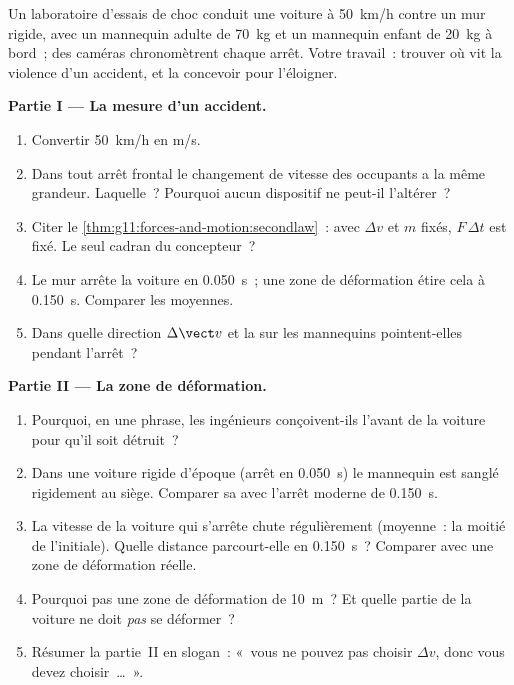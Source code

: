 \begin{problem}
\label{pb:g11:forces-and-motion:1}
Un laboratoire d'essais de choc conduit une voiture à \qty{50}{km/h}
contre un mur rigide, avec un mannequin adulte de \qty{70}{kg} et un
mannequin enfant de \qty{20}{kg} à bord~; des caméras chronomètrent
chaque arrêt. Votre travail~: trouver où vit la violence d'un accident,
et la concevoir pour l'éloigner.

\medskip
\noindent\textbf{Partie I --- La mesure d'un accident.}
\begin{enumerate}
  \item Convertir \qty{50}{km/h} en \unit{m/s}.
  \item Dans tout arrêt frontal le changement de vitesse des occupants
        a la même grandeur. Laquelle~? Pourquoi aucun dispositif ne
        peut-il l'altérer~?
  \item Citer le \cref{thm:g11:forces-and-motion:secondlaw}~: avec
        $\Delta v$ et $m$ fixés, $F\,\Delta t$ est fixé. Le seul cadran
        du concepteur~?
  \item Le mur arrête la voiture en \qty{0.050}{s}~; une zone de
        déformation étire cela à \qty{0.150}{s}. Comparer les
         moyennes.
  \item Dans quelle direction $\Delta \vect v$ et la
         sur les
        mannequins pointent-elles pendant l'arrêt~?
\end{enumerate}

\medskip
\noindent\textbf{Partie II --- La zone de déformation.}
\begin{enumerate}[resume]
  \item Pourquoi, en une phrase, les ingénieurs conçoivent-ils l'avant
        de la voiture pour qu'il soit détruit~?
  \item Dans une voiture rigide d'époque (arrêt en \qty{0.050}{s}) le
        mannequin est sanglé rigidement au siège. Comparer sa
         avec l'arrêt moderne de
        \qty{0.150}{s}.
  \item La vitesse de la voiture qui s'arrête chute régulièrement
        (moyenne~: la moitié de l'initiale). Quelle distance parcourt-elle
        en \qty{0.150}{s}~? Comparer avec une zone de déformation réelle.
  \item Pourquoi pas une zone de déformation de \qty{10}{m}~? Et quelle
        partie de la voiture ne doit \emph{pas} se déformer~?
  \item Résumer la partie~II en slogan~: «~vous ne pouvez pas choisir
        $\Delta v$, donc vous devez choisir~\dots~».
\end{enumerate}


\end{problem}

